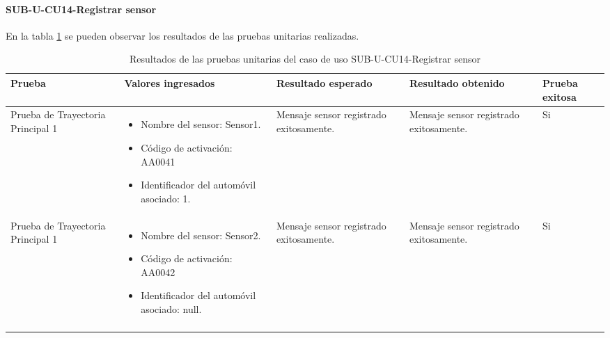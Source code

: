 \paragraph{SUB-U-CU14-Registrar sensor}\label{SUB-U-CU14:Pruebas}
En la tabla \ref{pruebas_unitarias_sub-u-cu14} se pueden observar los resultados de las pruebas unitarias realizadas.
\begin{longtable}{|M{2cm}| M{4.5cm}|M{3cm}|M{3cm}|M{1.5cm}|}
	\hline
	\textbf{Prueba} & \textbf{Valores ingresados} & \textbf{Resultado esperado} & \textbf{Resultado obtenido} & \textbf{Prueba exitosa} \\ \hline
	Prueba de Trayectoria Principal 1 & 
	\begin{itemize}
		\item Nombre del sensor: Sensor1.
		\item Código de activación: AA0041
		\item Identificador del automóvil asociado: 1.
	\end{itemize}
	& 
	Mensaje sensor registrado exitosamente.
	&
	Mensaje sensor registrado exitosamente.
	& Si \\ \hline

	Prueba de Trayectoria Principal 1 & 
	\begin{itemize}
		\item Nombre del sensor: Sensor2.
		\item Código de activación: AA0042
		\item Identificador del automóvil asociado: null.
	\end{itemize}
	& 
	Mensaje sensor registrado exitosamente.
	&
	Mensaje sensor registrado exitosamente.
	& Si \\ \hline

	\caption{Resultados de las pruebas unitarias del caso de uso SUB-U-CU14-Registrar sensor}
	\label{pruebas_unitarias_sub-u-cu14}
\end{longtable}

